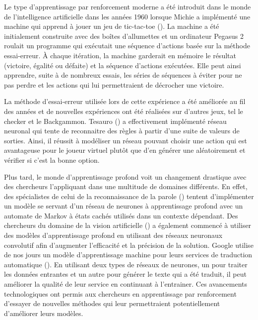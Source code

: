 \documentclass{article}
\begin{document}
Le type d'apprentissage par renforcement moderne a été introduit dans le monde de l'intelligence artificielle dans les années 1960 lorsque Michie a implémenté une machine qui apprend à jouer un jeu de tic-tac-toe (\cite{10.1093/comjnl/6.3.232}). La machine a été initialement construite avec des boîtes d'allumettes et un ordinateur Pegasus 2 roulait un programme qui exécutait une séquence d'actions basée sur la méthode essai-erreur. À chaque itération, la machine garderait en mémoire le résultat (victoire, égalité ou défaite) et la séquence d'actions exécutées. Elle peut ainsi apprendre, suite à de nombreux essais, les séries de séquences à éviter pour ne pas perdre et les actions qui lui permettraient de décrocher une victoire.
\linebreak

La méthode d'essai-erreur utilisée lors de cette expérience a été améliorée au fil des années et de nouvelles expériences ont été réalisées sur d'autres jeux, tel le checker et le	Backgammon. Tesauro (\cite{tesauro_sejnowski_1989}) a effectivement implémenté réseau neuronal qui tente de reconnaitre des règles à partir d'une suite de valeurs de sorties. Ainsi, il réussit à modéliser un réseau pouvant choisir une action qui est avantageuse pour le joueur virtuel plutôt que d'en générer une aléatoirement et vérifier si c'est la bonne option.
\linebreak

Plus tard, le monde d'apprentissage profond voit un changement drastique avec des chercheurs l'appliquant dans une multitude de domaines différents. En effet, des spécialistes de celui de la reconnaissance de la parole (\cite{dahl_yu_deng_acero_2012}) tentent d'implémenter un modèle se servant d'un réseau de neurones à apprentissage profond avec un  automate de Markov à états cachés utilisés dans un contexte dépendant. Des chercheurs du domaine de la vision artificielle (\cite{krizhevsky_sutskever_hinton_2017}) a également commencé à utiliser des modèles d'apprentissage profond en utilisant des réseaux neuronaux convolutif afin d'augmenter l'efficacité et la précision de la solution. Google utilise de nos jours un modèle d'apprentissage machine pour leurs services de traduction automatique (\cite{DBLP:journals/corr/WuSCLNMKCGMKSJL16}). En utilisant deux types de réseaux de neurones, un pour traiter les données entrantes et un autre pour générer le texte qui a été traduit, il peut améliorer la qualité de leur service en continuant à l'entrainer. Ces avancements technologiques ont permis aux chercheurs en apprentissage par renforcement d'essayer de nouvelles méthodes qui leur permettraient potentiellement d'améliorer leurs modèles.
\linebreak
\end{document}
